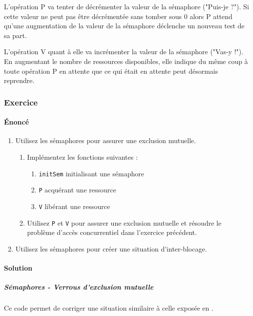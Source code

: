 \documentclass[a4paper, 12pt]{article}
\begin{document}
L'opération P va tenter de décrémenter la valeur de la sémaphore ("Puis-je ?"). Si cette valeur ne peut pas être décrémentée sans tomber sous $0$ alors P attend qu'une augmentation de la valeur de la sémaphore déclenche un nouveau test de sa part.

L'opération V quant à elle va incrémenter la valeur de la sémaphore ("Vas-y !"). En augmentant le nombre de ressources disponibles, elle indique du même coup à toute opération P en attente que ce qui était en attente peut désormais reprendre.

\subsubsection{Exercice}

\paragraph{Énoncé\\}

\begin{enumerate}
    \item Utilisez les sémaphores pour assurer une exclusion mutuelle.
        \begin{enumerate}                
	        \item Implémentez les fonctions suivantes :
		        \begin{enumerate}
		            \item \verb?initSem? initialisant une sémaphore
		            \item \verb?P? acquérant une ressource
		            \item \verb?V? libérant une ressource
		        \end{enumerate}
	        \item Utilisez \verb?P? et \verb?V? pour assurer une exclusion mutuelle et résoudre le problème d'accès concurrentiel dans l'exercice précédent.
        \end{enumerate}
    \item Utilisez les sémaphores pour créer une situation d'inter-blocage.
\end{enumerate}

\paragraph{Solution\\}
\subparagraph{Sémaphores - Verrous d'exclusion mutuelle\\}
Ce code permet de corriger une situation similaire à celle exposée en .
\end{document}
